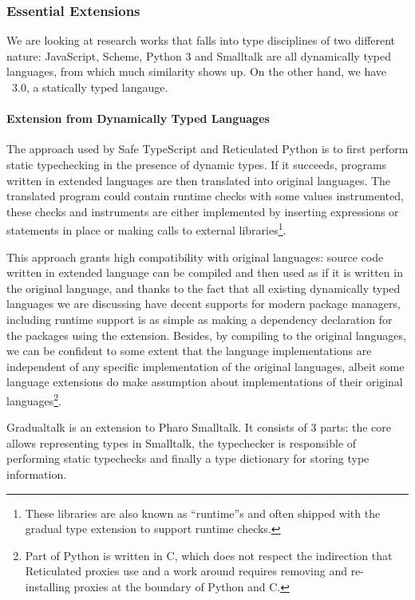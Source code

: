 \subsubsection{Essential Extensions}

We are looking at research works that falls into type disciplines of two different nature:
JavaScript, Scheme, Python 3 and Smalltalk are all dynamically typed languages, from which
much similarity shows up.
On the other hand, we have \csharp\ 3.0, a statically
typed langauge.

\paragraph{Extension from Dynamically Typed Languages}

The approach used by Safe TypeScript and Reticulated Python
is to first perform static typechecking in the presence of dynamic types.
If it succeeds, programs written in extended languages are then translated into original languages.
The translated program could contain runtime checks with some values instrumented,
these checks and instruments are either implemented by inserting expressions or statements in place or
making calls to external libraries\footnote{
	These libraries are also known as ``runtime''s
	and often shipped
	with the gradual type extension to support
	runtime checks.
}.

This approach grants high compatibility with original languages: source code written in extended language
can be compiled and then used as if it is written in the original language, and thanks to the fact
that all existing dynamically typed languages
we are discussing have decent supports for modern package managers,
including runtime support is as simple as making a dependency declaration
for the packages using the extension.
Besides, by compiling to the original languages,
we can be confident to some extent that the language implementations
are independent of any specific implementation of the original languages,
albeit some language extensions do make assumption about implementations of their original languages\footnote{
	Part of Python is written in C, which does not respect the indirection that
	Reticulated proxies use and a work around requires removing and re-installing
	proxies at the boundary of Python and C\cite{vitousek2014design}.
}.

Gradualtalk is an extension to Pharo Smalltalk. It consists of 3 parts:
the core allows representing types in Smalltalk, the typechecker
is responsible of performing static typechecks and finally
a type dictionary for storing type information.

